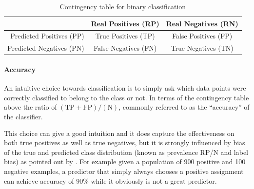 \begin{table}[h]
  \begin{center}
    \begin{tabular}{r | c c }
      & Real Positives (RP) & Real Negatives (RN) \\
      \hline
      Predicted Positives (PP) & True Positives (TP) & False Positives (FP) \\
      Predicted Negatives (PN) & False Negatives (FN) & True Negatives (TN) \\
    \end{tabular}
  \caption{Contingency table for binary classification}
  \label{table:contingency-table-2}
  \end{center}
\end{table}

\paragraph{Accuracy}
\label{par:Accuracy}

An intuitive choice towards classification is to simply ask which data points were correctly classified to belong to the class or not. In terms of the contingency table above the ratio of $(\text{TP} + \text{FP}) / (\text{N})$, commonly referred to as the ``accuracy'' of the classifier.

This choice can give a good intuition and it does capture the effectiveness on both true positives as well as true negatives, but it is strongly influenced by bias of the true and predicted class distribution (known as prevalence RP/N and label bias) as pointed out by \cite{Powers:2011aa}. For example given a population of 900 positive and 100 negative examples, a predictor that simply always chooses a positive assignment can achieve accuracy of 90\% while it obviously is not a great predictor.

\cite[Chapter 8.3, p.~155]{Manning:2008aa}

